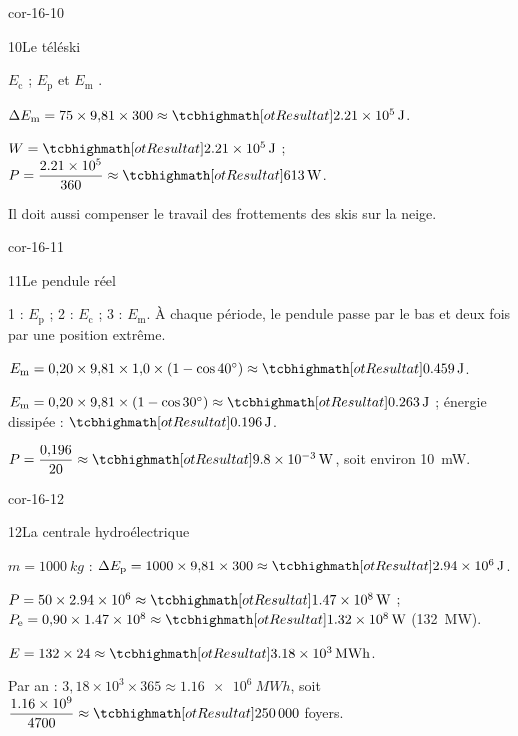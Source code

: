 \begin{blocLivre}{cor-16-10}
\begin{corrige}{10}{Le téléski}
\begin{questions}
\item $E_\mathrm{c}$  ; $E_\mathrm{p}$ et $E_\mathrm{m}$ .
\item $\Delta E_\mathrm{m}=75\times9{,}81\times300\approx\res{\qty{2,21e5}{J}}$.
\item $W=\res{\qty{2,21e5}{J}}$ ; $P=\dfrac{\num{2,21e5}}{360}\approx\res{\qty{613}{W}}$.
\item Il doit aussi compenser le travail  des frottements des skis sur la neige.
\end{questions}
\end{corrige}
\end{blocLivre}
\begin{blocLivre}{cor-16-11}
\begin{corrige}{11}{Le pendule réel}
\begin{questions}
\item 1 : $E_\mathrm{p}$ ; 2 : $E_\mathrm{c}$ ; 3 : $E_\mathrm{m}$. À chaque période, le pendule passe  par le bas et deux fois par une position extrême.
\item $E_\mathrm{m}=0{,}20\times9{,}81\times1{,}0\times(1-\cos\ang{40})\approx\res{\qty{0,459}{J}}$.
\item $E_\mathrm{m}=0{,}20\times9{,}81\times(1-\cos\ang{30})\approx\res{\qty{0,263}{J}}$ ; énergie dissipée : $\res{\qty{0,196}{J}}$.
\item $P=\dfrac{0{,}196}{20}\approx\res{\qty{9,8e-3}{W}}$, soit environ \qty{10}{mW}.
\end{questions}
\end{corrige}
\end{blocLivre}
\begin{blocLivre}{cor-16-12}
\begin{corrige}{12}{La centrale hydroélectrique}
\begin{questions}
\item $m=\qty{1000}{kg}$ : $\Delta E_\mathrm{p}=1000\times9{,}81\times300\approx\res{\qty{2,94e6}{J}}$.
\item $P=50\times\num{2,94e6}\approx\res{\qty{1,47e8}{W}}$ ; $P_\mathrm{e}=0{,}90\times\num{1,47e8}\approx\res{\qty{1,32e8}{W}}$ (\qty{132}{MW}).
\item $E=132\times24\approx\res{\qty{3,18e3}{MWh}}$.
\item Par an : $3{,}18\times10^{3}\times365\approx\qty{1,16e6}{MWh}$, soit $\dfrac{\num{1,16e9}}{4700}\approx\res{\num{250000}}$ foyers.
\end{questions}
\end{corrige}
\end{blocLivre}
